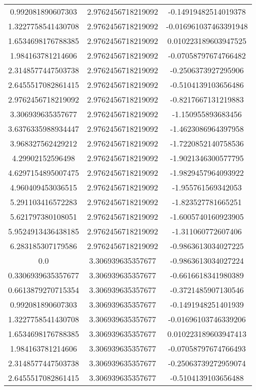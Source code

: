 \begin{table}
\begin{tabular}{ccc}
0.992081890607303 & 2.9762456718219092 & -0.14919482514019378 \\
1.3227758541430708 & 2.9762456718219092 & -0.016961037463391948 \\
1.6534698176788385 & 2.9762456718219092 & 0.010223189603947525 \\
1.984163781214606 & 2.9762456718219092 & -0.07058797674766482 \\
2.3148577447503738 & 2.9762456718219092 & -0.2506373927295906 \\
2.6455517082861415 & 2.9762456718219092 & -0.5104139103656486 \\
2.9762456718219092 & 2.9762456718219092 & -0.8217667131219883 \\
3.306939635357677 & 2.9762456718219092 & -1.150955893683456 \\
3.6376335988934447 & 2.9762456718219092 & -1.4623086964397958 \\
3.968327562429212 & 2.9762456718219092 & -1.7220852140758536 \\
4.29902152596498 & 2.9762456718219092 & -1.9021346300577795 \\
4.6297154895007475 & 2.9762456718219092 & -1.9829457964093922 \\
4.960409453036515 & 2.9762456718219092 & -1.955761569342053 \\
5.291103416572283 & 2.9762456718219092 & -1.823527781665251 \\
5.621797380108051 & 2.9762456718219092 & -1.6005740160923905 \\
5.9524913436438185 & 2.9762456718219092 & -1.311060772607406 \\
6.283185307179586 & 2.9762456718219092 & -0.9863613034027225 \\
0.0 & 3.306939635357677 & -0.9863613034027224 \\
0.3306939635357677 & 3.306939635357677 & -0.6616618341980389 \\
0.6613879270715354 & 3.306939635357677 & -0.3721485907130546 \\
0.992081890607303 & 3.306939635357677 & -0.1491948251401939 \\
1.3227758541430708 & 3.306939635357677 & -0.01696103746339206 \\
1.6534698176788385 & 3.306939635357677 & 0.010223189603947413 \\
1.984163781214606 & 3.306939635357677 & -0.07058797674766493 \\
2.3148577447503738 & 3.306939635357677 & -0.25063739272959074 \\
2.6455517082861415 & 3.306939635357677 & -0.5104139103656488 \\

\end{tabular}
\end{table}
